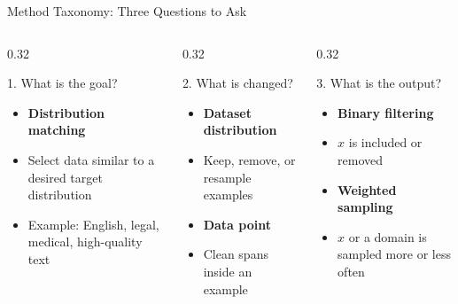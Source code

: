 \documentclass[aspectratio=169]{beamer}
\begin{document}

\begin{frame}{Method Taxonomy: Three Questions to Ask}

\begin{columns}[T,totalwidth=\textwidth]

\begin{column}{0.32\textwidth}
\begin{block}{1. What is the goal?}
\begin{itemize}
  \item \textbf{Distribution matching}
  \item Select data similar to a desired target distribution
  \item Example: English, legal, medical, high-quality text
\end{itemize}
\end{block}
\end{column}

\begin{column}{0.32\textwidth}
\begin{block}{2. What is changed?}
\begin{itemize}
  \item \textbf{Dataset distribution}
  \item Keep, remove, or resample examples
  \item \textbf{Data point}
  \item Clean spans inside an example
\end{itemize}
\end{block}
\end{column}

\begin{column}{0.32\textwidth}
\begin{block}{3. What is the output?}
\begin{itemize}
  \item \textbf{Binary filtering}
  \item $x$ is included or removed
  \item \textbf{Weighted sampling}
  \item $x$ or a domain is sampled more or less often
\end{itemize}
\end{block}
\end{column}


\end{columns}
\end{frame}
\end{document}
